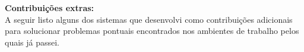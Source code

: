 \documentclass[12pt,a4paper,oneside,sumario=tradicional,brazil]{abntex2}
\begin{document}
%


\textbf{{\Large Contribuições extras:}} \\
\indent
A seguir listo alguns dos sistemas que desenvolvi como contribuições adicionais para solucionar problemas pontuais encontrados nos ambientes de trabalho pelos quais já passei.

\
\end{document}
